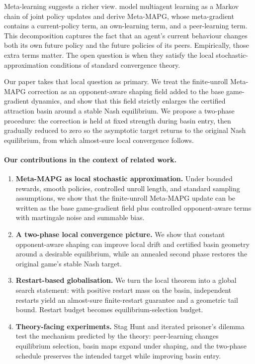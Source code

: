 \documentclass{nextgame2026} %
\begin{document}
Meta-learning suggests a richer view. \citet{kim2021meta} model multiagent learning as a Markov chain of joint policy updates and derive Meta-MAPG, whose meta-gradient contains a current-policy term, an own-learning term, and a peer-learning term. This decomposition captures the fact that an agent's current behaviour changes both its own future policy and the future policies of its peers. Empirically, those extra terms matter. The open question is when they satisfy the local stochastic-approximation conditions of standard convergence theory.

Our paper takes that local question as primary. We treat the finite-unroll Meta-MAPG correction as an opponent-aware shaping field added to the base game-gradient dynamics, and show that this field strictly enlarges the certified attraction basin around a stable Nash equilibrium. We propose a two-phase procedure: the correction is held at fixed strength during basin entry, then gradually reduced to zero so the asymptotic target returns to the original Nash equilibrium, from which almost-sure local convergence follows. 


\paragraph{Our contributions in the context of related work.}
\begin{enumerate}[label=\arabic*),leftmargin=1.4em,itemsep=0.2em]
\item \textbf{Meta-MAPG as local stochastic approximation.} Under bounded rewards, smooth policies, controlled unroll length, and standard sampling assumptions, we show that the finite-unroll Meta-MAPG update can be written as the base game-gradient field plus controlled opponent-aware terms with martingale noise and summable bias.
\item \textbf{A two-phase local convergence picture.} We show that constant opponent-aware shaping can improve local drift and certified basin geometry around a desirable equilibrium, while an annealed second phase restores the original game's stable Nash target.
\item \textbf{Restart-based globalisation.} We turn the local theorem into a global search statement: with positive restart mass on the basin, independent restarts yield an almost-sure finite-restart guarantee and a geometric tail bound. Restart budget becomes equilibrium-selection budget.
\item \textbf{Theory-facing experiments.} Stag Hunt and iterated prisoner's dilemma test the mechanism predicted by the theory: peer-learning changes equilibrium selection, basin maps expand under shaping, and the two-phase schedule preserves the intended target while improving basin entry.
\end{enumerate}
\end{document}
